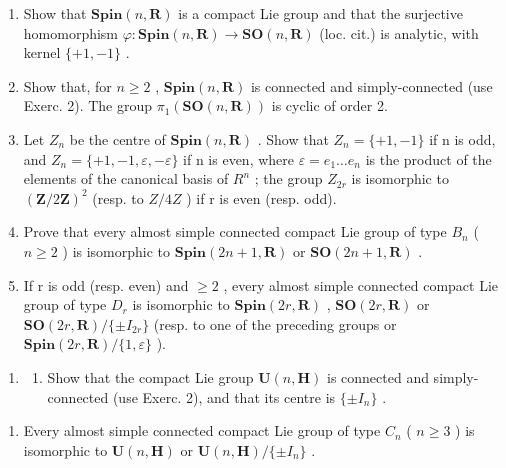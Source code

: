 \begin{enumerate}
\def\labelenumi{\alph{enumi})}
\item
  Show that \(\mathbf{Spin}(n,\mathbf{R})\) is a compact Lie group and that the surjective homomorphism \(\varphi:\mathbf{Spin}(n,\mathbf{R})\to\mathbf{SO}(n,\mathbf{R})\) (loc. cit.) is analytic, with kernel \(\{+1,-1\}\) .
\item
  Show that, for \(n \geq 2\) , \(\mathbf{Spin}(n, \mathbf{R})\) is connected and simply-connected (use Exerc. 2). The group \(\pi_{1}(\mathbf{SO}(n, \mathbf{R}))\) is cyclic of order 2.
\item
  Let \(Z_{n}\) be the centre of \(\mathbf{Spin}(n,\mathbf{R})\) . Show that \(Z_{n}=\{+1,-1\}\) if n is odd, and \(Z_{n}=\{+1,-1,\varepsilon,-\varepsilon\}\) if n is even, where \(\varepsilon=e_{1}\ldots e_{n}\) is the product of the elements of the canonical basis of \(R^{n}\) ; the group \(Z_{2r}\) is isomorphic to \((\mathbf{Z}/2\mathbf{Z})^{2}\) (resp. to \(Z/4Z\) ) if r is even (resp. odd).
\item
  Prove that every almost simple connected compact Lie group of type \(B_{n}\) ( \(n \geq 2\) ) is isomorphic to \(\mathbf{Spin}(2n + 1, \mathbf{R})\) or \(\mathbf{SO}(2n + 1, \mathbf{R})\) .
\item
  If r is odd (resp. even) and \(\geq 2\) , every almost simple connected compact Lie group of type \(D_{r}\) is isomorphic to \(\mathbf{Spin}(2r,\mathbf{R})\) , \(\mathbf{SO}(2r,\mathbf{R})\) or \(\mathbf{SO}(2r,\mathbf{R})/\{\pm I_{2r}\}\) (resp. to one of the preceding groups or \(\mathbf{Spin}(2r,\mathbf{R})/\{1,\varepsilon\}\) ).
\end{enumerate}

\begin{enumerate}
\def\labelenumi{\arabic{enumi})}
\setcounter{enumi}{5}
\tightlist
\item
  \begin{enumerate}
  \def\labelenumii{\alph{enumii})}
  \tightlist
  \item
    Show that the compact Lie group \(\mathbf{U}(n,\mathbf{H})\) is connected and simply-connected (use Exerc. 2), and that its centre is \(\{\pm I_{n}\}\) .
  \end{enumerate}
\end{enumerate}

\begin{enumerate}
\def\labelenumi{\alph{enumi})}
\setcounter{enumi}{1}
\tightlist
\item
  Every almost simple connected compact Lie group of type \(C_{n}\) ( \(n \geq 3\) ) is isomorphic to \(\mathbf{U}(n, \mathbf{H})\) or \(\mathbf{U}(n, \mathbf{H}) / \{\pm I_{n}\}\) .
\end{enumerate}

